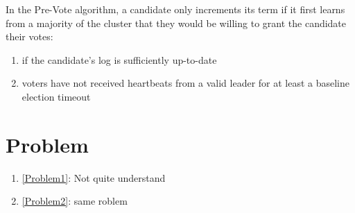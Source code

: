 \documentclass[11pt]{article}
\begin{document}
In the Pre-Vote algorithm, a candidate only increments its term if it first learns from a majority of
the cluster that they would be willing to grant the candidate their votes:
\begin{enumerate}
\item if the candidate's log is sufficiently up-to-date
\item voters have not received heartbeats from a valid leader for at least a baseline election timeout
\end{enumerate}
\section{Problem}
\label{sec:org00ca297}
\begin{enumerate}
\item \ref{Problem1}: Not quite understand
\item \ref{Problem2}: same roblem
\end{enumerate}
\end{document}
